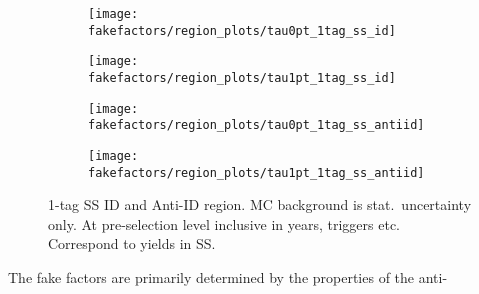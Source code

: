 \begin{figure}[htbp]
  \centering

  \begin{subfigure}{0.49\textwidth}
    \texttt{[image: fakefactors/region\_plots/tau0pt\_1tag\_ss\_id]}
  \end{subfigure}
  \begin{subfigure}{0.49\textwidth}
    \texttt{[image: fakefactors/region\_plots/tau1pt\_1tag\_ss\_id]}
  \end{subfigure}

  \begin{subfigure}{0.49\textwidth}
    \texttt{[image: fakefactors/region\_plots/tau0pt\_1tag\_ss\_antiid]}
  \end{subfigure}
  \begin{subfigure}{0.49\textwidth}
    \texttt{[image: fakefactors/region\_plots/tau1pt\_1tag\_ss\_antiid]}
  \end{subfigure}

  \caption{1-tag SS ID and Anti-ID region. MC background is stat.\
    uncertainty only. At pre-selection level inclusive in years,
    triggers etc. Correspond to yields in
     SS.}
  \label{fig:mjfakes_1tag_ss_plots}
\end{figure}

The fake factors are primarily determined by the properties of the
anti-\tauhadvis



